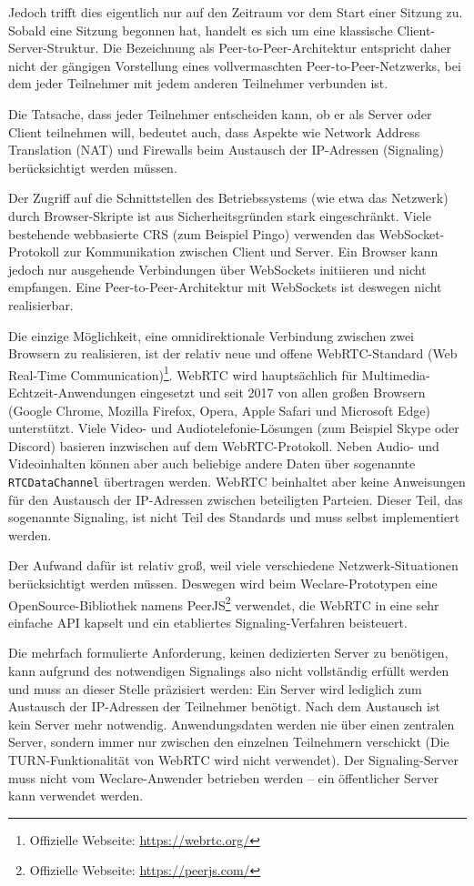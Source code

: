 Jedoch trifft dies eigentlich nur auf den Zeitraum vor dem Start einer Sitzung zu. Sobald eine Sitzung begonnen hat, handelt es sich um eine klassische Client-Server-Struktur. Die Bezeichnung als Peer-to-Peer-Architektur entspricht daher nicht der gängigen Vorstellung eines vollvermaschten Peer-to-Peer-Netzwerks, bei dem jeder Teilnehmer mit jedem anderen Teilnehmer verbunden ist.

Die Tatsache, dass jeder Teilnehmer entscheiden kann, ob er als Server oder Client teilnehmen will, bedeutet auch, dass Aspekte wie Network Address Translation (NAT) und Firewalls beim Austausch der IP-Adressen (Signaling) berücksichtigt werden müssen.

Der Zugriff auf die Schnittstellen des Betriebssystems (wie etwa das Netzwerk) durch Browser-Skripte ist aus Sicherheitsgründen stark eingeschränkt. Viele bestehende webbasierte CRS (zum Beispiel Pingo) verwenden das WebSocket-Protokoll zur Kommunikation zwischen Client und Server. Ein Browser kann jedoch nur ausgehende Verbindungen über WebSockets initiieren und nicht empfangen. Eine Peer-to-Peer-Architektur mit WebSockets ist deswegen nicht realisierbar.

Die einzige Möglichkeit, eine omnidirektionale Verbindung zwischen zwei Browsern zu realisieren, ist der relativ neue und offene WebRTC-Standard (Web Real-Time Communication)\footnote{Offizielle Webseite: \url{https://webrtc.org/}}. WebRTC wird hauptsächlich für Multimedia-Echtzeit-Anwendungen eingesetzt und seit 2017 von allen großen Browsern (Google Chrome, Mozilla Firefox, Opera, Apple Safari und Microsoft Edge) unterstützt. Viele Video- und Audiotelefonie-Lösungen (zum Beispiel Skype oder Discord) basieren inzwischen auf dem WebRTC-Protokoll. Neben Audio- und Videoinhalten können aber auch beliebige andere Daten über sogenannte \texttt{RTCDataChannel} übertragen werden. WebRTC beinhaltet aber keine Anweisungen für den Austausch der IP-Adressen zwischen beteiligten Parteien. Dieser Teil, das sogenannte Signaling, ist nicht Teil des Standards und muss selbst implementiert werden.

Der Aufwand dafür ist relativ groß, weil viele verschiedene Netzwerk-Situationen berücksichtigt werden müssen. Deswegen wird beim Weclare-Prototypen eine OpenSource-Bibliothek namens PeerJS\footnote{Offizielle Webseite: \url{https://peerjs.com/}} verwendet, die WebRTC in eine sehr einfache API kapselt und ein etabliertes Signaling-Verfahren beisteuert.

Die mehrfach formulierte Anforderung, keinen dedizierten Server zu benötigen, kann aufgrund des notwendigen Signalings also nicht vollständig erfüllt werden und muss an dieser Stelle präzisiert werden: Ein Server wird lediglich zum Austausch der IP-Adressen der Teilnehmer benötigt. Nach dem Austausch ist kein Server mehr notwendig. Anwendungsdaten werden nie über einen zentralen Server, sondern immer nur zwischen den einzelnen Teilnehmern verschickt (Die TURN-Funktionalität von WebRTC wird nicht verwendet). Der Signaling-Server muss nicht vom Weclare-Anwender betrieben werden – ein öffentlicher Server kann verwendet werden.

